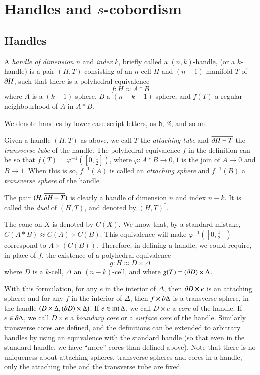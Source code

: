 

\chapter{Handles and $s$-cobordism}

\section{Handles}\label{chap8-sec8.1}\pageoriginale

A {\em handle of dimension} $n$ and {\em index} $k$, briefly called a $(n,k)$-handle, (or a $k$-handle) is a pair $(H,T)$ consisting of an $n$-cell $H$ and $(n-1)$-manifold $T$ of $\partial H$, such that there is a polyhedral equivalence
$$
f:H\approx A\ast B
$$
where $A$ is a $(k-1)$-sphere, $B$ a $(n-k-1)$-sphere, and $f(T)$ a regular neighbourhood of $A$ in $A\ast B$.

We denote handles by lower case script letters, as $\mathfrak{h}$, $\mathfrak{K}$, and so on.

Given a handle $(H,T)$ as above, we call $T$ the {\em attaching tube} and $\overline{\partial H-T}$ the {\em transverse tube} of the handle. The polyhedral equivalence $f$ in the definition can be so that $f(T)=\varphi^{-1}([0,\frac{1}{2}])$, where $\varphi:A\ast B\to 0,1$ is the join of $A\to 0$ and $B\to 1$. When this is so, $f^{-1}(A)$ is called an {\em attaching sphere} and $f^{-1}(B)$ a {\em transverse sphere} of the handle.

The pair $(H,\overline{\partial H-T})$ is clearly a handle of dimension $n$ and index $n-k$. It is called the {\em dual} of $(H,T)$, and denoted by $(H,T)^{\ast}$. 

The cone on $X$ is denoted by $C(X)$. We know that, by a standard mistake, $C(A\ast B)\approx C(A)\times C(B)$. This equivalence will make $\varphi^{-1}([0,\frac{1}{2}])$ correspond to $A\times (C(B))$. Therefore, in defining a handle, we could require, in place of $f$, the existence of a polyhedral equivalence\pageoriginale 
$$
g:H\approx D\times \Delta
$$
where $D$ is a $k$-cell, $\Delta$ an $(n-k)$-cell, and where $g(T)=(\partial D)\times \Delta$.

With this formulation, for any $e$ in the interior of $\Delta$, then $\partial D\times e$ is an attaching sphere; and for any $f$ in the interior of $\Delta$, then $f\times \partial \Delta$ is a transverse sphere, in the handle $(D\times \Delta,(\partial D)\times \Delta)$. If $e\in \text{int\,}\Delta$, we call $D\times e$ a {\em core} of the handle. If $e\in\partial \Delta$, we call $D\times e$ a {\em boundary core} or a {\em surface core} of the handle. Similarly transverse cores are defined, and the definitions can be extended to arbitrary handles by using an equivalence with the standard handle (so that even in the standard handle, we have ``more'' cores than defined above). Note that there is no uniqueness about attaching spheres, transverse spheres and cores in a handle, only the attaching tube and the transverse tube are fixed.

